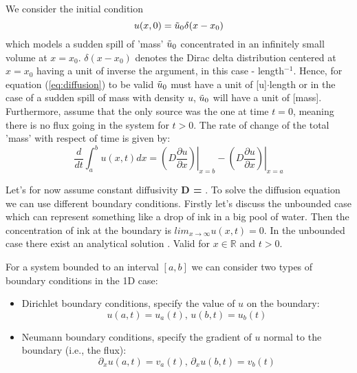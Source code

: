 \documentclass[5p,sort&compress]{elsarticle}
\numberwithin{equation}{subsection}
\begin{document}
We consider the initial condition
\begin{equation}
u(x,0) = \Tilde{u}_0 \delta(x-x_0)
\label{eq:diff_IC}
\end{equation}
which models a sudden spill of 'mass' $\Tilde{u}_0$ concentrated in an infinitely small volume at $x = x_0$. $\delta (x-x_0)$ denotes the Dirac delta distribution centered at $x = x_0$ having a unit of inverse the argument, in this case - length$^{-1}$. Hence, for equation (\ref{eq:diffusion}) to be valid $\Tilde{u}_0$ must have a unit of [u]$\cdot$length or in the case of a sudden spill of mass with density $u$, $\Tilde{u}_0$ will have a unit of [mass]. Furthermore, assume that the only source was the one at time $t = 0$, meaning there is no flux going in the system for $t>0$. The rate of change of the total 'mass' with respect of time is given by:
\begin{equation}
    \frac{d}{dt}\int_a^b u(x,t) dx = \left. \left( D\frac{\partial u}{\partial x}\right)\right|_{x=b} -  \left. \left( D\frac{\partial u}{\partial x}\right)\right|_{x=a}
    \label{eq:mass_conservation}
\end{equation}

Let's for now assume constant diffusivity \textbf{D = }. To solve the diffusion equation we can use different boundary conditions. Firstly let's discuss the unbounded case which can represent something like a drop of ink in a big pool of water. Then the concentration of ink at the boundary is $lim_{x\rightarrow\infty} u(x,t) = 0$. In the unbounded case there exist an analytical solution \cite{assignment}.
Valid for $x \in \mathbb{R}$ and $t > 0$. \cite{assignment}

For a system bounded to an interval $[a,b]$ we can consider two types of boundary conditions in the 1D case:
\begin{itemize}
    \item Dirichlet boundary conditions, specify the value of $u$ on the boundary:
    \begin{equation}
    u(a,t) = u_a(t) \text{, } u(b,t) = u_b(t)
    \label{eq:dirichlet}
    \end{equation}

    \item Neumann boundary conditions, specify the gradient of $u$ normal to the boundary (i.e., the flux):
    \begin{equation}
    \partial_x u(a,t) = v_a(t) \text{, } \partial_x u(b,t) = v_b(t)
    \label{eq:neumann}
    \end{equation}
\end{itemize}
\end{document}
